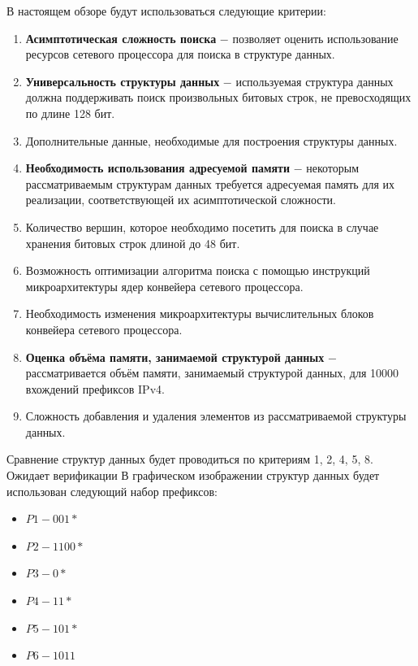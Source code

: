 \documentclass[a4paper, 12pt, titlepage, finall]{extreport}
\begin{document}
        В настоящем обзоре будут использоваться следующие критерии:
        \begin{enumerate}
            \item {\bf Асимптотическая сложность поиска} $-$ позволяет оценить использование ресурсов сетевого процессора для поиска в структуре данных.
            \item {\bf Универсальность структуры данных} $-$ используемая структура данных должна поддерживать поиск произвольных битовых строк,
                  не превосходящих по длине 128 бит.
            \item Дополнительные данные, необходимые для построения структуры данных.
            \item {\bf Необходимость использования адресуемой памяти} $-$ некоторым рассматриваемым структурам данных требуется адресуемая память для их реализации, соответствующей их асимптотической сложности.
            \item Количество вершин, которое необходимо посетить для поиска в случае хранения битовых строк длиной до 48 бит.
            \item Возможность оптимизации алгоритма поиска с помощью инструкций микроархитектуры ядер конвейера сетевого процессора.
            \item Необходимость изменения микроархитектуры вычислительных блоков конвейера сетевого процессора.
            \item {\bf Оценка объёма памяти, занимаемой структурой данных} $-$ рассматривается объём памяти, занимаемый структурой данных, для 10000 вхождений префиксов IPv4.
            \item Сложность добавления и удаления элементов из рассматриваемой структуры данных.
        \end{enumerate}
        Сравнение структур данных будет проводиться по критериям 1, 2, 4, 5, 8. {\ttfamily Ожидает верификации}
        \newpage
        В графическом изображении структур данных будет использован следующий набор префиксов:
        \begin{itemize}
            \item $P1 - 001*$
            \item $P2 - 1100*$
            \item $P3 - 0*$
            \item $P4 - 11*$
            \item $P5 - 101*$
            \item $P6 - 1011$
        \end{itemize}
\end{document}
